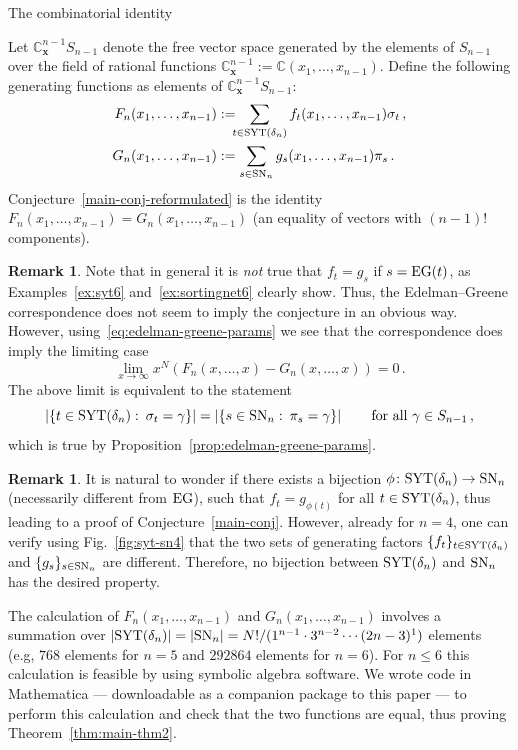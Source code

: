 \documentclass[a4paper,reqno,12pt]{amsart}
\makeatletter
\theoremstyle{plain}
\theoremstyle{definition}
\newtheorem{rem}[thm]{Remark}
\renewcommand\subsection{\@startsection{subsection}{2}%
  \z@{.5\linespacing\@plus.7\linespacing}{-.5em}%
  {\bfseries\scshape}}
\newcommand{\C}{\mathbb{C}}
\newcommand{\sym}{S}
\newcommand{\freevecspace}{\mathbb{C}_{\mathbf{x}}^{n-1}S}
\newcommand{\syt}{\textnormal{SYT}}
\newcommand{\staircase}{\delta}
\newcommand{\sort}{\textnormal{SN}}
\newcommand{\eg}{\textnormal{EG}}
\newcommand{\1}{\mathbbm{1}}
\makeatother
\begin{document}
\subsection{The combinatorial identity}
\label{subsec:combinIdentity}

Let $\freevecspace_{n-1}$ denote the free vector space generated by the elements of $\sym_{n-1}$ over the field of rational functions $\C_\mathbf{x}^{n-1}:=\C(x_1,\ldots,x_{n-1})$.
Define the following generating functions as elements of $\freevecspace_{n-1}$:
\begin{align}
F_n(x_1,\ldots,x_{n-1}) &:=\!\!\! \sum_{t\in \syt(\staircase_n)} f_t(x_1,\ldots,x_{n-1}) \sigma_t \, ,
\label{eq:genfun-F}
\\
G_n(x_1,\ldots,x_{n-1}) &:= \sum_{s\in \sort_n} 
g_s(x_1,\ldots,x_{n-1}) \pi_s \, .
\label{eq:genfun-G}
\end{align}
Conjecture~\ref{main-conj-reformulated} is the identity $F_n(x_1,\ldots,x_{n-1}) = G_n(x_1,\ldots,x_{n-1})$ (an equality of vectors with $(n-1)!$ components).
\begin{rem}
Note that in general it is \emph{not} true that $f_t = g_s$ if $s=\eg(t)$, as Examples~\ref{ex:syt6} and~\ref{ex:sortingnet6} clearly show. Thus, the Edelman--Greene correspondence does not seem to imply the conjecture in an obvious way. However, using~\eqref{eq:edelman-greene-params} we see that the  correspondence does imply the limiting case 
\begin{equation}
\lim\limits_{x \to\infty} x^N (F_n(x,\ldots,x)-G_n(x,\dots,x))=0 \, .
\label{eq:genfun-G_limiting}
\end{equation}
The above limit is equivalent to the statement
\[
\left|\{t\in\syt(\staircase_n)\,\colon\, \sigma_t=\gamma\}\right|=\left|\{s\in\sort_n\,\colon\, \pi_s=\gamma\}\right| \qquad \text{for all $\gamma\in S_{n-1}$} \, ,
\]
which is true by Proposition~\ref{prop:edelman-greene-params}.
\end{rem}
\begin{rem}
It is natural to wonder if there exists a bijection $\phi\colon \syt(\staircase_n) \to \sort_n$ (necessarily different from $\eg$), such that $f_t = g_{\phi(t)}$ for all $t\in \syt(\staircase_n)$, thus leading to a proof of Conjecture~\ref{main-conj}.
However, already for $n=4$, one can verify using Fig.~\ref{fig:syt-sn4} that the two sets of generating factors $\{f_t\}_{t\in \syt(\staircase_n)}$ and $\{g_s\}_{s\in \sort_n}$ are different.
Therefore, no bijection between $\syt(\staircase_n)$ and $\sort_n$ has the desired property.
\end{rem}
The calculation of $F_n(x_1,\ldots,x_{n-1})$ and $G_n(x_1,\ldots,x_{n-1})$ involves a summation over $|\syt(\staircase_n)|=|\sort_n|=N!/(1^{n-1}\cdot3^{n-2}\cdots(2n-3)^1)$ elements (e.g, $768$ elements for $n=5$ and $292864$ elements for $n=6$). For $n\leq 6$ this calculation is feasible by using symbolic algebra software.
We wrote code in Mathematica --- downloadable as a companion package \cite{orientedswaps-mathematica} to this paper --- to perform this calculation and check that the two functions are equal, thus proving Theorem~\ref{thm:main-thm2}.
\end{document}
